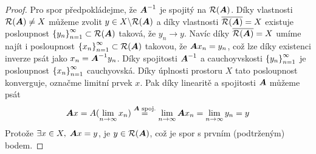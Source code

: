 \begin{proof}
    Pro spor předpokládejme, že $\boldsymbol{A}^{-1}$ je spojitý na $\mathcal{R}(\boldsymbol{A})$. Díky vlastnosti $\mathcal{R}(\boldsymbol{A}) \neq X$ můžeme zvolit $y\in X\backslash \mathcal{R}(\boldsymbol{A}) $ a díky vlastnosti $\overline{\mathcal{R}(\boldsymbol{A})}=X$ existuje posloupnost $\left \lbrace y_n \right \rbrace_{n=1}^\infty \subset \mathcal{R}(\boldsymbol{A})$ taková, že $y_n \rightarrow y$. Navíc díky $\overline{\mathcal{R}(\boldsymbol{A})}=X$ umíme najít i posloupnost $\left \lbrace x_n \right \rbrace_{n=1}^\infty \subset \mathcal{R}(\boldsymbol{A})$ takovou, že $\boldsymbol{A} x_n = y_n$, což lze díky existenci inverze psát jako $x_n = \boldsymbol{A}^{-1} y_n$. Díky spojitosti $\boldsymbol{A}^{-1}$ a cauchoyvskosti $\left \lbrace y_n \right \rbrace_{n=1}^\infty$ je posloupnost $\left \lbrace x_n \right \rbrace_{n=1}^\infty$ cauchyovská. Díky úplnosti prostoru $X$ tato posloupnost konverguje, označme limitní prvek $x$. Pak díky linearitě a spojitosti $\boldsymbol{A}$ můžeme psát \begin{align*}
        \boldsymbol{A}x=A(\lim\limits_{n\rightarrow \infty} x_n)\overset{\boldsymbol{A} \text{ spoj.}}{=} \lim\limits_{n\rightarrow \infty} \boldsymbol{A} x_n = \lim\limits_{n\rightarrow \infty} y_n= y
    \end{align*}
    Protože $\exists x\in X,\; \boldsymbol{A}x=y$, je $y\in\mathcal{R}(\boldsymbol{A})$, což je spor s prvním (podtrženým) bodem.
    
\end{proof}

